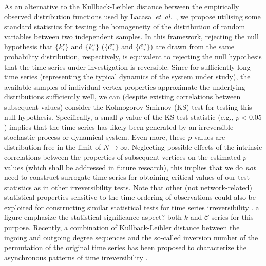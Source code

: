 		As an alternative to the Kullback-Leibler distance between the empirically observed distribution functions used by Lacasa~\textit{et~al.}~\cite{Lacasa2012}, we propose utilising some standard statistics for testing the homogeneity of the distribution of random variables between two independent samples. In this framework, rejecting the null hypothesis that {$\{k_i^{r}\}$ and $\{k_i^{a}\}$} ({$\{\mathcal{C}_i^{r}\}$ and $\{\mathcal{C}_i^{a}\}$}) are drawn from the same probability distribution, respectively, is equivalent to rejecting the null hypothesis that the time series under investigation is reversible. {Since for sufficiently long time series (representing the typical dynamics of the system under study), the available samples of individual vertex properties approximate the underlying distributions sufficiently well, we can (despite existing correlations between subsequent values)} consider the Kolmogorov-Smirnov (KS) test {for} testing this null hypothesis. {Specifically}, a small $p$-value of the KS test statistic (e.g., $p<0.05$) implies that the time series has likely been generated by an irreversible stochastic process or dynamical system. Even more, the{se} $p$-values are distribution-free in the limit of $N\to\infty$. {Neglecting possible effects of the intrinsic correlations between the properties of subsequent vertices on the estimated $p$-values (which shall be addressed in future research), this} implies that we do \textit{not} need to construct surrogate time series for obtaining critical values of our test statistics as in other {ir}reversibility tests. Note that other (not network-related) statistical properties sensitive to the time-ordering of observations could also be exploited for constructing similar statistical tests for time series irreversibility \cite{Donges2013}.  {\color{red} a figure emphasize the statistical significance aspect? both $k$ and $\mathcal{C}$ series for this purpose.} Recently, a combination of Kullback-Leibler distance between the ingoing and outgoing degree sequences and the so-called inversion number of the permutation of the original time series has been proposed to characterize the asynchronous patterns of time irreversibility \cite{Yang2018}. 

